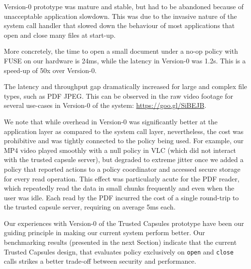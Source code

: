 Version-0 prototype was mature and stable, but had to be abandoned
because of unacceptable application slowdown. This was due to the
invasive nature of the system call handler that slowed down the
behaviour of most applications that open and close many files at
start-up. 

More concretely, the time to open a small document under a no-op
policy with FUSE on our hardware is 24ms, %
while the latency in Version-0 was 1.2s. %
This is a speed-up of 50x over Version-0.


The latency and throughput gap dramatically increased for large and
complex file types, such as PDF JPEG. This can be observed in the raw
video footage for several use-cases in Version-0 of the system:
\url{https://goo.gl/SiBEJB}.

We note that while overhead in Version-0 was significantly better at
the application layer as compared to the system call layer,
nevertheless, the cost was prohibitive and was tightly connected to
the policy being used.
%
%
For example, our MP4 video played smoothly with a null policy in VLC
(which did not interact with the trusted capsule server), but degraded
to extreme jitter once we added a policy that reported actions to a
policy coordinator and accessed secure storage for every read
operation. This effect was particularly acute for the PDF reader,
which repeatedly read the data in small chunks frequently and even
when the user was idle. Each read by the PDF incurred the cost of a
single round-trip to the trusted capsule server, requiring on average
5ms each. 

Our experiences with Version-0 of the Trusted Capsules prototype have
been our guiding principle in making our current system perform
better.
%
Our benchmarking results (presented in the next Section) indicate that
the current Trusted Capsules design, that evaluates policy exclusively
on \texttt{open} and \texttt{close} calls strikes a better trade-off
between security and performance.


